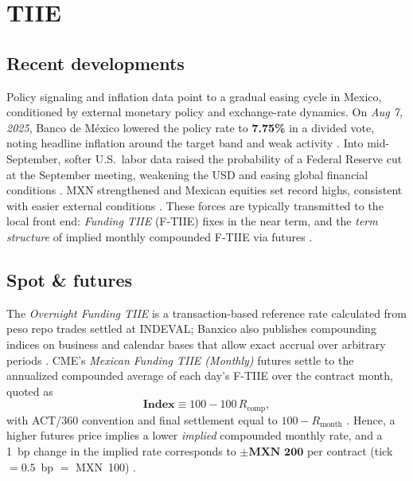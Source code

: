 \documentclass[11pt,a4paper]{article} %
\let\oldsection\section
\renewcommand{\section}{%
    \clearpage
    \thispagestyle{myfancy}%
    \oldsection
  }
\begin{document}
\section{TIIE}

\subsection{Recent developments}
Policy signaling and inflation data point to a gradual easing cycle in Mexico, conditioned by external monetary policy and exchange-rate dynamics. On \emph{Aug 7, 2025}, Banco de México lowered the policy rate to \textbf{7.75\%} in a divided vote, noting headline inflation around the target band and weak activity \citep{reuters_banxico_cut_aug25,banxico_mps_aug7_2025}. Into mid-September, softer U.S.\ labor data raised the probability of a Federal Reserve cut at the September meeting, weakening the USD and easing global financial conditions \citep{reuters_global_cuts_sep11a,reuters_global_cuts_sep11b}. MXN strengthened and Mexican equities set record highs, consistent with easier external conditions \citep{reuters_mxn_sept15}. These forces are typically transmitted to the local front end: \emph{Funding TIIE} (F-TIIE) fixes in the near term, and the \emph{term structure} of implied monthly compounded F-TIIE via futures \citep{frbny_sofr_page,fred_sofr}.

\subsection{Spot \& futures}
The \emph{Overnight Funding TIIE} is a transaction-based reference rate calculated from peso repo trades settled at INDEVAL; Banxico also publishes compounding indices on business and calendar bases that allow exact accrual over arbitrary periods \citep{banxico_f_tiie_method,banxico_indices_page,banxico_on_method_en}. CME’s \emph{Mexican Funding TIIE (Monthly)} futures settle to the annualized compounded average of each day’s F-TIIE over the contract month, quoted as
\[
\textbf{Index} \equiv 100 - 100\,R_{\text{comp}},
\]
with ACT/360 convention and final settlement equal to \(100 - R_{\text{month}}\) \citep{cme_tiie_monthly_overview,cme_tiie_monthly_specs,cme_tiie_monthly_method,cme_tiie_quarterly_overview}. Hence, a higher futures price implies a lower \emph{implied} compounded monthly rate, and a 1~bp change in the implied rate corresponds to \(\pm \textbf{MXN 200}\) per contract (tick \(=0.5\)~bp \(=\) MXN~100) \citep{cme_tiie_monthly_specs}.
\end{document}
